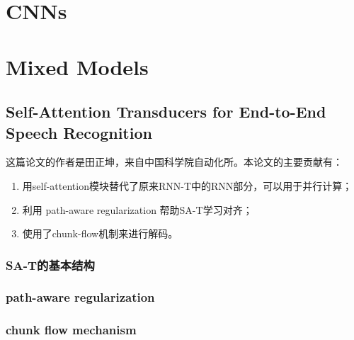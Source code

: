 \section{CNNs}

\section{Mixed Models}

\subsection{Self-Attention Transducers for End-to-End Speech Recognition}
这篇论文的作者是田正坤，来自中国科学院自动化所。本论文的主要贡献有：
\begin{enumerate}
  \item 用self-attention模块替代了原来RNN-T中的RNN部分，可以用于并行计算；
  \item 利用 path-aware regularization 帮助SA-T学习对齐；
  \item 使用了chunk-flow机制来进行解码。
\end{enumerate}

\subsubsection{SA-T的基本结构}

\subsubsection{path-aware regularization}

\subsubsection{chunk flow mechanism}


